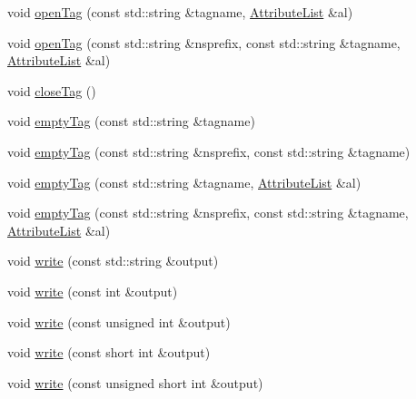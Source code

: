 \begin{DoxyCompactItemize}
\item 
void \mbox{\hyperlink{classXMLWriterAPI_1_1XMLSimpleWriter_a0cd766e4b96a8c67580c8b304faced84}{open\+Tag}} (const std\+::string \&tagname, \mbox{\hyperlink{namespaceXMLWriterAPI_a28cf3d8051a4ccf0aef208b7ebc66d07}{Attribute\+List}} \&al)
\item 
void \mbox{\hyperlink{classXMLWriterAPI_1_1XMLSimpleWriter_a4c32b9b8afe37e1ea1b0723d5248f140}{open\+Tag}} (const std\+::string \&nsprefix, const std\+::string \&tagname, \mbox{\hyperlink{namespaceXMLWriterAPI_a28cf3d8051a4ccf0aef208b7ebc66d07}{Attribute\+List}} \&al)
\item 
void \mbox{\hyperlink{classXMLWriterAPI_1_1XMLSimpleWriter_a29af28d2a197f00ad568f39304ecdbe5}{close\+Tag}} ()
\item 
void \mbox{\hyperlink{classXMLWriterAPI_1_1XMLSimpleWriter_ae75e5988a4d97721ee9be5c7a18abfc4}{empty\+Tag}} (const std\+::string \&tagname)
\item 
void \mbox{\hyperlink{classXMLWriterAPI_1_1XMLSimpleWriter_a91df124fb76053c30cd8ca1a8dc779e9}{empty\+Tag}} (const std\+::string \&nsprefix, const std\+::string \&tagname)
\item 
void \mbox{\hyperlink{classXMLWriterAPI_1_1XMLSimpleWriter_a5246369b7cd462e29546da9beb7bdc33}{empty\+Tag}} (const std\+::string \&tagname, \mbox{\hyperlink{namespaceXMLWriterAPI_a28cf3d8051a4ccf0aef208b7ebc66d07}{Attribute\+List}} \&al)
\item 
void \mbox{\hyperlink{classXMLWriterAPI_1_1XMLSimpleWriter_aa5572c81fdebc241db0eac912f0b2b73}{empty\+Tag}} (const std\+::string \&nsprefix, const std\+::string \&tagname, \mbox{\hyperlink{namespaceXMLWriterAPI_a28cf3d8051a4ccf0aef208b7ebc66d07}{Attribute\+List}} \&al)
\item 
void \mbox{\hyperlink{classXMLWriterAPI_1_1XMLSimpleWriter_a1c5de7aca63e28a5e02a3f054a2b2a75}{write}} (const std\+::string \&output)
\item 
void \mbox{\hyperlink{classXMLWriterAPI_1_1XMLSimpleWriter_a2a072319bedcf9fe4ebe991ecd549b56}{write}} (const int \&output)
\item 
void \mbox{\hyperlink{classXMLWriterAPI_1_1XMLSimpleWriter_a07831082bd1741aab15b9ec8f0e4042b}{write}} (const unsigned int \&output)
\item 
void \mbox{\hyperlink{classXMLWriterAPI_1_1XMLSimpleWriter_a3a512bd09f82648b2f711bf5817bd581}{write}} (const short int \&output)
\item 
void \mbox{\hyperlink{classXMLWriterAPI_1_1XMLSimpleWriter_a6d2718e6dd405323aa2e5647fa6a6173}{write}} (const unsigned short int \&output)

\end{DoxyCompactItemize}
